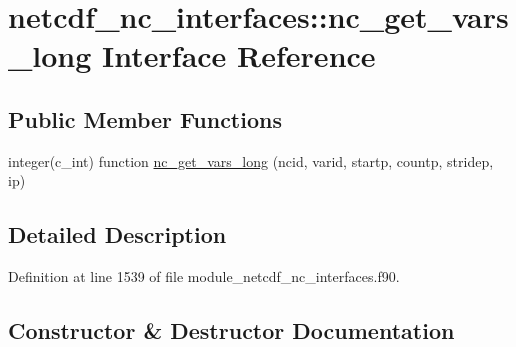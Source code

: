 \hypertarget{interfacenetcdf__nc__interfaces_1_1nc__get__vars__long}{}\section{netcdf\+\_\+nc\+\_\+interfaces\+:\+:nc\+\_\+get\+\_\+vars\+\_\+long Interface Reference}
\label{interfacenetcdf__nc__interfaces_1_1nc__get__vars__long}
\subsection*{Public Member Functions}
\begin{DoxyCompactItemize}
\item 
integer(c\+\_\+int) function \hyperlink{interfacenetcdf__nc__interfaces_1_1nc__get__vars__long_ab5a5096e40deca217bc34ae718332615}{nc\+\_\+get\+\_\+vars\+\_\+long} (ncid, varid, startp, countp, stridep, ip)
\end{DoxyCompactItemize}


\subsection{Detailed Description}


Definition at line 1539 of file module\+\_\+netcdf\+\_\+nc\+\_\+interfaces.\+f90.



\subsection{Constructor \& Destructor Documentation}
\mbox{\label{interfacenetcdf__nc__interfaces_1_1nc__get__vars__long_ab5a5096e40deca217bc34ae718332615}} 
